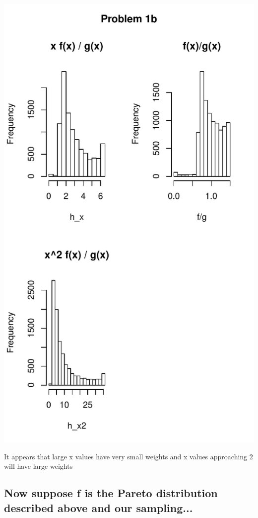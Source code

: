 \documentclass{article}\usepackage[]{graphicx}\usepackage[]{color}
\makeatletter
\def\maxwidth{ %
  \ifdim\Gin@nat@width>\linewidth
    \linewidth
  \else
    \Gin@nat@width
  \fi
}
\newenvironment{knitrout}{}{} %
\makeatother
\begin{document}
\begin{knitrout}
\includegraphics[width=\maxwidth]{figure/unnamed-chunk-2-1} 

\end{knitrout}

It appears that large x values have very small weights and x values approaching 2 will have large weights
\subsection{Now suppose f is the Pareto distribution described above and our sampling...}
\end{document}
